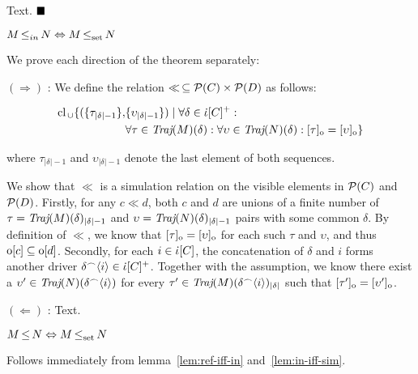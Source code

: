 Text. $\Qed$

\begin{lemma} \label{lem:in-iff-sim}
$M \operatorname{\leq}_{in} N \Leftrightarrow M \operatorname{\operatorname{\leq}_{\textrm{set}}} N$
\end{lemma}

We prove each direction of the theorem separately:

$(\Rightarrow)$ : We define the relation $\ll \, \subseteq \mathcal{P}(C) \times \mathcal{P}(D)$ as follows:

\begin{align*}
\textrm{cl}_{\, \cup} \{ ( \{ \tau_{| \delta | - 1} \} , & \{ \upsilon_{| \delta | - 1} \} ) \mid \forall \delta \in \dot{\iota}[C]^{+} : \\ & \forall \tau \in \operatorname{\textit{Traj}}(M)(\delta) : \forall \upsilon \in \operatorname{\textit{Traj}}(N)(\delta) : [\tau]_{\mathrm{o}} = [\upsilon]_{\mathrm{o}} \}
\end{align*}

\noindent where $\tau_{| \delta | - 1}$ and $\upsilon_{| \delta | - 1}$ denote the last element of both sequences.

We show that $\ll$ is a simulation relation on the visible elements in $\mathcal{P}(C)$ and $\mathcal{P}(D)$. Firstly, for any $c \ll d$, both $c$ and $d$ are unions of a finite number of $\tau = \operatorname{\textit{Traj}}(M)(\delta)_{| \delta | - 1}$ and $\upsilon = \operatorname{\textit{Traj}}(N)(\delta)_{| \delta | - 1}$ pairs with some common $\delta$. By definition of $\ll$, we know that $[\tau]_{\mathrm{o}} = [\upsilon]_{\mathrm{o}}$ for each such $\tau$ and $\upsilon$, and thus $\mathrm{o}[c] \subseteq \mathrm{o}[d]$. Secondly, for each $i \in \dot{\iota}[C]$, the concatenation of $\delta$ and $i$ forms another driver $\delta^{\frown} \langle i \rangle \in \dot{\iota}[C]^{+}$. Together with the assumption, we know there exist a $\upsilon' \in \operatorname{\textit{Traj}}(N)(\delta^{\frown} \langle i \rangle)$ for every $\tau' \in \operatorname{\textit{Traj}}(M)(\delta^{\frown} \langle i \rangle)_{| \delta |}$ such that $[\tau']_{\mathrm{o}} = [\upsilon']_{\mathrm{o}}$.


$(\Leftarrow)$ : Text.

\begin{corollary}
$M \operatorname{\leq} N \Leftrightarrow M \operatorname{\operatorname{\leq}_{\textrm{set}}} N$
\end{corollary}

Follows immediately from lemma~\ref{lem:ref-iff-in} and~\ref{lem:in-iff-sim}.
